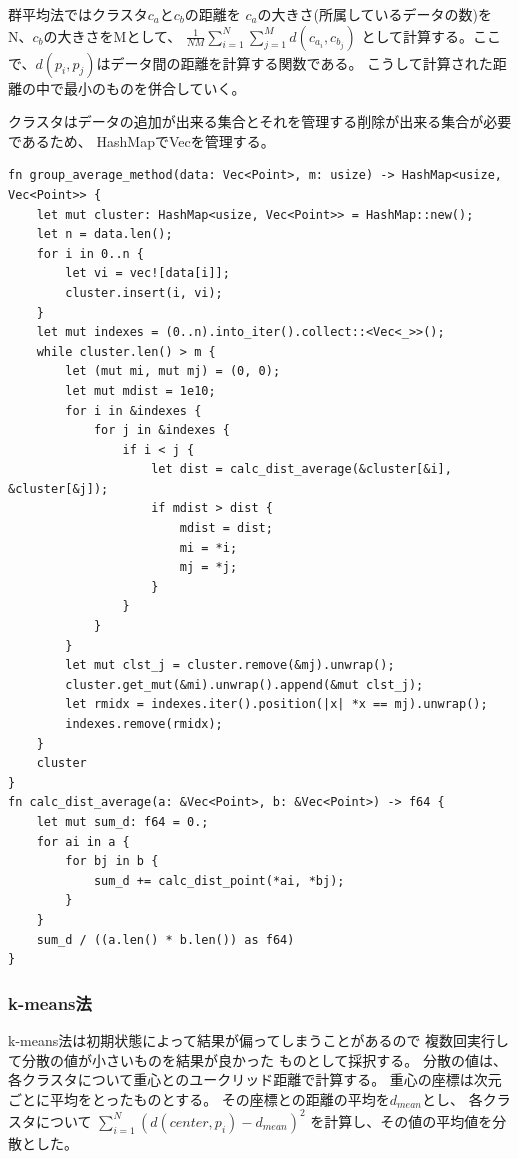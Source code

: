 \documentclass[dvipdfmx]{jsarticle}
\begin{document}
群平均法ではクラスタ$c_a$と$c_b$の距離を
$c_a$の大きさ(所属しているデータの数)をN、$c_b$の大きさをMとして、
$\frac{1}{NM} \sum_{i=1}^{N} \sum_{j=1}^{M} d(c_{a_i},c_{b_j})$
として計算する。ここで、$d(p_i,p_j)$はデータ間の距離を計算する関数である。
こうして計算された距離の中で最小のものを併合していく。

クラスタはデータの追加が出来る集合とそれを管理する削除が出来る集合が必要であるため、
HashMapでVecを管理する。

\begin{lstlisting}[caption=群平均法の実装,label=code:rust_gam]
fn group_average_method(data: Vec<Point>, m: usize) -> HashMap<usize, Vec<Point>> {
    let mut cluster: HashMap<usize, Vec<Point>> = HashMap::new();
    let n = data.len();
    for i in 0..n {
        let vi = vec![data[i]];
        cluster.insert(i, vi);
    }
    let mut indexes = (0..n).into_iter().collect::<Vec<_>>();
    while cluster.len() > m {
        let (mut mi, mut mj) = (0, 0);
        let mut mdist = 1e10;
        for i in &indexes {
            for j in &indexes {
                if i < j {
                    let dist = calc_dist_average(&cluster[&i], &cluster[&j]);
                    if mdist > dist {
                        mdist = dist;
                        mi = *i;
                        mj = *j;
                    }
                }
            }
        }
        let mut clst_j = cluster.remove(&mj).unwrap();
        cluster.get_mut(&mi).unwrap().append(&mut clst_j);
        let rmidx = indexes.iter().position(|x| *x == mj).unwrap();
        indexes.remove(rmidx);
    }
    cluster
}
fn calc_dist_average(a: &Vec<Point>, b: &Vec<Point>) -> f64 {
    let mut sum_d: f64 = 0.;
    for ai in a {
        for bj in b {
            sum_d += calc_dist_point(*ai, *bj);
        }
    }
    sum_d / ((a.len() * b.len()) as f64)
}
\end{lstlisting}

\subsubsection{k-means法}

k-means法は初期状態によって結果が偏ってしまうことがあるので
複数回実行して分散の値が小さいものを結果が良かった
ものとして採択する。
分散の値は、各クラスタについて重心とのユークリッド距離で計算する。
重心の座標は次元ごとに平均をとったものとする。
その座標との距離の平均を$d_{mean}$とし、
各クラスタについて
$\sum_{i=1}^{N} (d(center,p_i)-d_{mean})^2$
を計算し、その値の平均値を分散とした。
\end{document}
